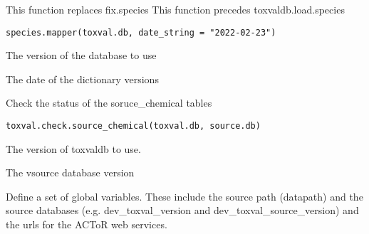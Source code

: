 \documentclass[letterpaper]{book}
\begin{document}
%
\begin{Description}\relax
This function replaces fix.species
This function precedes toxvaldb.load.species
\end{Description}
%
\begin{Usage}
\begin{verbatim}
species.mapper(toxval.db, date_string = "2022-02-23")
\end{verbatim}
\end{Usage}
%
\begin{Arguments}
\begin{ldescription}
\item[\code{toxval.db}] The version of the database to use

\item[\code{date\_string}] The date of the dictionary versions
\end{ldescription}
\end{Arguments}
%
\begin{Description}\relax
Check the status of the soruce\_chemical tables
\end{Description}
%
\begin{Usage}
\begin{verbatim}
toxval.check.source_chemical(toxval.db, source.db)
\end{verbatim}
\end{Usage}
%
\begin{Arguments}
\begin{ldescription}
\item[\code{toxval.db}] The version of toxvaldb to use.

\item[\code{source.db}] The vsource database version
\end{ldescription}
\end{Arguments}
%
\begin{Description}\relax
Define a set of global variables. These include the source path (datapath)
and the source databases (e.g. dev\_toxval\_version and dev\_toxval\_source\_version)
and the urls for the ACToR web services.
\end{Description}
\end{document}
